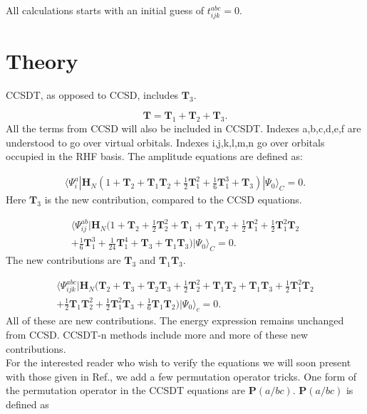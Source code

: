All calculations starts with an initial guess of $t_{ijk}^{abc} = 0$.

\section{Theory}
CCSDT, as opposed to CCSD, includes $\textbf{T}_3$. 

\begin{equation}
\textbf{T} = \textbf{T}_1 + \textbf{T}_2 + \textbf{T}_3 .
\end{equation}
All the terms from CCSD will also be included in CCSDT. Indexes a,b,c,d,e,f are understood to go over virtual orbitals. Indexes i,j,k,l,m,n go over orbitals occupied in the RHF basis. The amplitude equations are defined as:

\begin{align}
\langle \Psi_i^a | \textbf{H}_N (1 + \textbf{T}_2 + \textbf{T}_1 \textbf{T}_2 + \frac{1}{2} \textbf{T}_1^2 + \frac{1}{6} \textbf{T}_1^3 + \textbf{T}_3) | \Psi_0 \rangle_C = 0.
\end{align}
Here $\textbf{T}_3$ is the new contribution, compared to the CCSD equations.

\begin{align}
\langle \Psi_{ij}^{ab} | \textbf{H}_N (
1 + \textbf{T}_2 + \frac{1}{2} \textbf{T}_2^2
+ \textbf{T}_1 + \textbf{T}_1 \textbf{T}_2 + \frac{1}{2} \textbf{T}_1^2 
+ \frac{1}{2} \textbf{T}_1^2 \textbf{T}_2 \nonumber \\
+ \frac{1}{6} \textbf{T}_1^3 + \frac{1}{24} \textbf{T}_1^4 + \textbf{T}_3 + \textbf{T}_1 \textbf{T}_3) | \Psi_0 \rangle_C = 0.
\end{align}
The new contributions are $\textbf{T}_3$ and $\textbf{T}_1 \textbf{T}_3$. 

\begin{align}
\langle \Psi_{ijk}^{abc} | \textbf{H}_N (
\textbf{T}_2 + \textbf{T}_3 + \textbf{T}_2 \textbf{T}_3 + \frac{1}{2} \textbf{T}_2^2
+ \textbf{T}_1 \textbf{T}_2 + \textbf{T}_1 \textbf{T}_3 + \frac{1}{2} \textbf{T}_1^2 \textbf{T}_2 
\nonumber \\
+ \frac{1}{2} \textbf{T}_1 \textbf{T}_2^2 + \frac{1}{2} \textbf{T}_1^2 \textbf{T}_3 + \frac{1}{6} \textbf{T}_1 \textbf{T}_2) | \Psi_0 \rangle_c = 0.
\end{align}
All of these are new contributions. The energy expression remains unchanged from CCSD. CCSDT-n methods include more and more of these new contributions. \\

For the interested reader who wish to verify the equations we will soon present with those given in Ref.\cite{CCSDT-ref4}, we add a few permutation operator tricks. One form of the permutation operator in the CCSDT equations are $\textbf{P}(a/bc)$. $\textbf{P}(a/bc)$ is defined as

